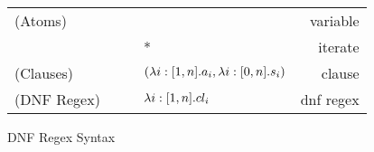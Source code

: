 \begin{figure}
\begin{tabular}{l@{\ }l@{\ }c@{\ }l@{\ }r}

(Atoms)& \Atom{} & \GEq{} & \UserDefined{} & variable\\
& & &\GBar{} \DNFRegex{}* & iterate \\
(Clauses)& \Clause{} & \GEq{} &
$(\lambda i:[1,n].a_i,\lambda i:[0,n].s_i)$ & clause\\
(DNF Regex)& \DNFRegex{} & \GEq{} & $\lambda i:[1,n].cl_i$ & dnf regex\\
\end{tabular}
\caption{DNF Regex Syntax}
\label{fig:dnf-regex-definition}
\end{figure}
